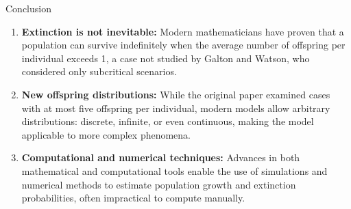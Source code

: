 \documentclass[palette=none,mode=dark]{impaTeXPoster}
\begin{document}
\begin{columns}
\begin{postercard}{Conclusion}
\begin{enumerate}
    \item \textbf{Extinction is not inevitable:} Modern mathematicians have proven that a population can survive indefinitely when the average number of offspring per individual exceeds 1, a case not studied by Galton and Watson, who considered only subcritical scenarios.
    \item \textbf{New offspring distributions:} While the original paper examined cases with at most five offspring per individual, modern models allow arbitrary distributions: discrete, infinite, or even continuous, making the model applicable to more complex phenomena.
    \item \textbf{Computational and numerical techniques:} Advances in both mathematical and computational tools enable the use of simulations and numerical methods to estimate population growth and extinction probabilities, often impractical to compute manually.
\end{enumerate}

\end{postercard}


\end{columns}
\end{document}
